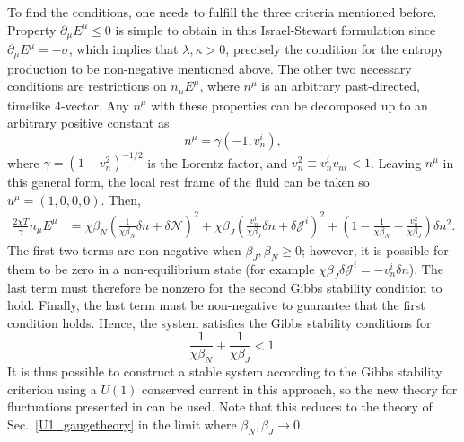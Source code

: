 \documentclass[aps,prd,nofootinbib,amsmath,amssymb,showpacs,longbibliography,singlecolumn,superscriptaddress,notitlepage]{revtex4-1}
\theoremstyle{plain}
\theoremstyle{definition}
\begin{document}
To find the conditions, one needs to fulfill the three criteria mentioned before. Property $\partial_{\mu} E^{\mu} \leq 0$ is simple to obtain in this Israel-Stewart formulation since $\partial_{\mu} E^{\mu} = -\sigma$, which implies that $\lambda, \kappa > 0$, precisely the condition for the entropy production to be non-negative mentioned above. The other two necessary conditions are restrictions on $n_{\mu} E^{\mu}$, where $n^{\mu}$ is an arbitrary past-directed, timelike 4-vector. Any $n^{\mu}$ with these properties can be decomposed up to an arbitrary positive constant as 
\begin{equation}
    n^{\mu} = \gamma (-1, v_n^i) ,
\end{equation}
where $\gamma = (1 - v_n^2)^{-1/2}$ is the Lorentz factor, and $v_n^2 \equiv v_n^i v_{ni} < 1$. Leaving $n^{\mu}$ in this general  form, the local rest frame of the fluid can be taken so $u^{\mu} = (1, 0,0,0)$. Then, 
\begin{equation}
\begin{split}
    \frac{2\chi T}{\gamma} n_{\mu} E^{\mu} & = \chi \beta_N \left( \frac{1}{\chi \beta_N} \delta n + \delta \mathcal{N} \right)^2 + \chi \beta_J \left( \frac{v_n^i}{\chi \beta_J} \delta n + \delta \mathcal{J}^i \right)^2 + \left( 1 - \frac{1}{\chi \beta_N} - \frac{v_n^2}{\chi \beta_J} \right) \delta n^2 .
\end{split}
\end{equation}
The first two terms are non-negative when $\beta_J, \beta_N \geq 0$; however, it is possible for them to be zero in a non-equilibrium state (for example $\chi \beta_J \delta \mathcal{J}^i = - v_n^i \delta n$). The last term must therefore be nonzero for the second Gibbs stability condition to hold. Finally, the last term must be non-negative to guarantee that the first condition holds. Hence, the system satisfies the Gibbs stability conditions for 
\begin{equation}
    \frac{1}{\chi \beta_N} + \frac{1}{\chi \beta_J} < 1 .
\end{equation}
It is thus possible to construct a stable system according to the Gibbs stability criterion using a $U(1)$ conserved current in this approach, so the new theory for fluctuations presented in \cite{Mullins:2023tjg} can be used. Note that this reduces to the theory of Sec.\ \ref{U1_gaugetheory} in the limit where $\beta_N, \beta_J \rightarrow 0$. 
\end{document}
